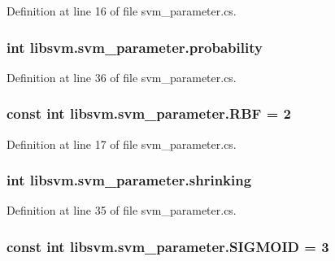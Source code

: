 Definition at line 16 of file svm\_\-parameter.cs.

\hypertarget{classlibsvm_1_1svm__parameter_ab5587f981ecb2861a0fc3a06a9a9a735}{
\subsubsection[{probability}]{\setlength{\rightskip}{0pt plus 5cm}int {\bf libsvm.svm\_\-parameter.probability}}}
\label{classlibsvm_1_1svm__parameter_ab5587f981ecb2861a0fc3a06a9a9a735}


Definition at line 36 of file svm\_\-parameter.cs.

\hypertarget{classlibsvm_1_1svm__parameter_a2bbce6717a86b966604e0a198955b3e2}{
\subsubsection[{RBF}]{\setlength{\rightskip}{0pt plus 5cm}const int {\bf libsvm.svm\_\-parameter.RBF} = 2}}
\label{classlibsvm_1_1svm__parameter_a2bbce6717a86b966604e0a198955b3e2}


Definition at line 17 of file svm\_\-parameter.cs.

\hypertarget{classlibsvm_1_1svm__parameter_a37c13e0bb9d33cbc6e44bfa430baeafd}{
\subsubsection[{shrinking}]{\setlength{\rightskip}{0pt plus 5cm}int {\bf libsvm.svm\_\-parameter.shrinking}}}
\label{classlibsvm_1_1svm__parameter_a37c13e0bb9d33cbc6e44bfa430baeafd}


Definition at line 35 of file svm\_\-parameter.cs.

\hypertarget{classlibsvm_1_1svm__parameter_a72a669e28a3d474626e204d13bd6a88d}{
\subsubsection[{SIGMOID}]{\setlength{\rightskip}{0pt plus 5cm}const int {\bf libsvm.svm\_\-parameter.SIGMOID} = 3}}
\label{classlibsvm_1_1svm__parameter_a72a669e28a3d474626e204d13bd6a88d}


